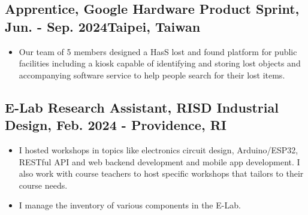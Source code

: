 \documentclass[12pt]{article}
\begin{document}
    \subsection*{Apprentice, Google Hardware Product Sprint, Jun. - Sep. 2024\hfill Taipei, Taiwan}
        { \small
        \begin{itemize}
            \item Our team of 5 members designed a HasS lost and found platform for public facilities including a kiosk capable of identifying and storing lost objects and accompanying software service to help people search for their lost items.
        \end{itemize}
        }
    \subsection*{E-Lab Research Assistant, RISD Industrial Design, Feb. 2024 -  \hfill Providence, RI}
        { \small
        \begin{itemize}
            \item I hosted workshops in topics like electronics circuit design, Arduino/ESP32, RESTful API and web backend development and mobile app development.
            I also work with course teachers to host specific workshops that tailors to their course needs.
            \item I manage the inventory of various components in the E-Lab.
        \end{itemize}
        }
\end{document}
